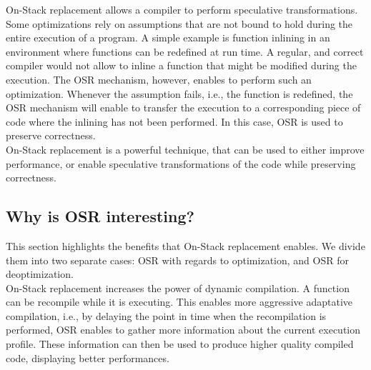 On-Stack replacement allows a compiler to perform speculative transformations.
Some optimizations rely on assumptions that are not bound to hold during the entire execution of a program.
A simple example is function inlining in an environment where functions can be redefined at run time.
A regular, and correct compiler would not allow to inline a function that might be modified during the execution.
The OSR mechanism, however, enables to perform such an optimization.
Whenever the assumption fails, i.e., the function is redefined, the OSR mechanism will enable to transfer the execution to a corresponding piece of code where the inlining has not been performed.
In this case, OSR is used to preserve correctness.\\

On-Stack replacement is a powerful technique, that can be used to either improve performance, or enable speculative transformations of the code while preserving correctness.

\subsection{Why is OSR interesting?}\label{WhyOSRInteresting}
    
This section highlights the benefits that On-Stack replacement enables.
We divide them into two separate cases: OSR with regards to optimization, and OSR for deoptimization.\\

On-Stack replacement increases the power of dynamic compilation.
A function can be recompile while it is executing.
This enables more aggressive adaptative compilation, i.e., by delaying the point in time when the recompilation is performed, OSR enables to gather more information about the current execution profile. These information can then be used to produce higher quality compiled code, displaying better performances.\\

